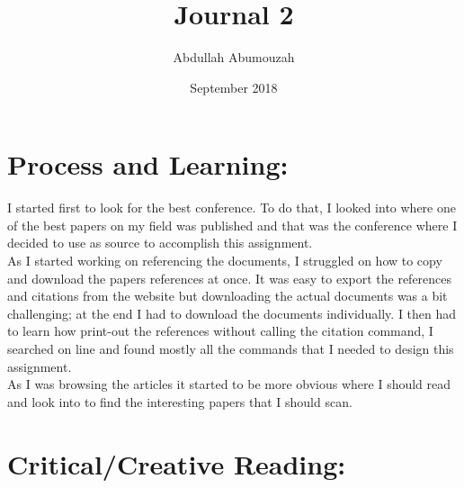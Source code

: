 \documentclass{article}
\title{Journal 2}
\author{Abdullah Abumouzah}
\date{September 2018}
\begin{document}
\maketitle

\nocite{*}
\section{Process and Learning:}
I started first to look for the best conference. To do that, I looked into where one of the best papers on my field was published and that was the conference where I decided to use as source to accomplish this assignment.\\ 
As I started working on referencing the documents, I struggled on how to copy and download the papers references at once. It was easy to export the references and citations from the website but downloading the actual documents was a bit challenging; at the end I had to download the documents individually. 
I then had to learn how print-out the references without calling the  citation command, I searched on line and found mostly all the commands that I needed to design this assignment.\\
As I was browsing the articles it started to be more obvious where I should read and look into to find the interesting papers that I should scan. 


\section{Critical/Creative Reading:}


	\clearpage
	
	

	
\end{document}
